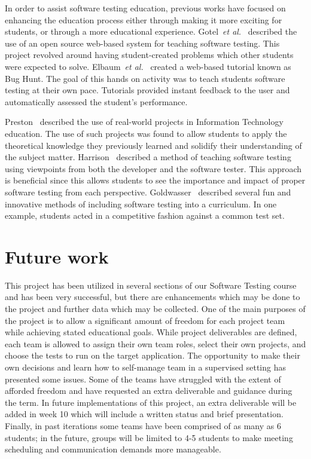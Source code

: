 \documentclass{sig-alternate}
\begin{document}
In order to assist software testing education, previous works have focused on enhancing the education process either through making it more exciting for students, or through a more educational experience. Gotel~\emph{et al.}~\cite{Gotel:2008:TSQ:1597849.1384329} described the use of an open source web-based system for teaching software testing. This project revolved around having student-created problems which other students were expected to solve. Elbaum~\emph{et al.}~\cite{Elbaum:2007:BHM:1248820.1248899} created a web-based tutorial known as Bug Hunt. The goal of this hands on activity was to teach students software testing at their own pace. Tutorials provided instant feedback to the user and automatically assessed the student's performance.

Preston~\cite{Preston:2005:UAR:1869667.1869671} described the use of real-world projects in Information Technology education. The use of such projects was found to allow students to apply the theoretical knowledge they previously learned and solidify their understanding of the subject matter. Harrison~\cite{Harrison:2010:TST:1858583.1858591} described a method of teaching software testing using viewpoints from both the developer and the software tester. This approach is beneficial since this allows students to see the importance and impact of proper software testing from each perspective. Goldwasser~\cite{Goldwasser:2002:GIS:563517.563446} described several fun and innovative methods of including software testing into a curriculum. In one example, students acted in a competitive fashion against a common test set.

\section{Future work}
\label{sec: futurework}



This project has been utilized in several sections of our Software Testing course and has been very successful, but there are enhancements which may be done to the project and further data which may be collected. One of the main purposes of the project is to allow a significant amount of freedom for each project team while achieving stated educational goals. While project deliverables are defined, each team is allowed to assign their own team roles, select their own projects, and choose the tests to run on the target application. The opportunity to make their own decisions and learn how to self-manage team in a supervised setting has presented some issues. Some of the teams have struggled with the extent of afforded freedom and have requested an extra deliverable and guidance during the term. In future implementations of this project, an extra deliverable will be added in week 10 which will include a written status and brief presentation. Finally, in past iterations some teams have been comprised of as many as 6 students; in the future, groups will be limited to 4-5 students to make meeting scheduling and communication demands more manageable.
\end{document}
